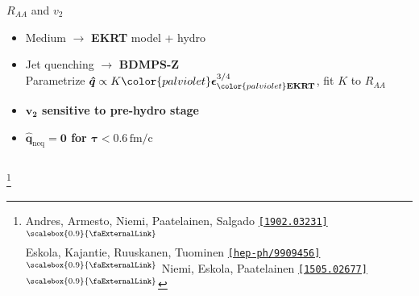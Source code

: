 \documentclass[aspectratio=169,11pt,usenames,dvipsnames]{beamer}
\renewcommand{\thefootnote}{\color{customblue}\faPaperPlaneO}
\newcommand\blfootnote[1]{%
  \begingroup
  \renewcommand\thefootnote{}\footnote{#1}%
  \addtocounter{footnote}{-1}%
  \endgroup
}
\begin{document}
\begin{frame}[t]
\begin{columns}[onlytextwidth,t]
\begin{center}
            {\Large\color{palgold} $R_{AA}$ and $v_2$  \\[10pt]}
            \footnotesize
                \begin{itemize}
                    \item {\color{lightgray}Medium $\rightarrow$ {\bfseries\color{palviolet} EKRT} model + hydro}
                    \item {\color{lightgray}Jet quenching $\rightarrow$ {\bfseries BDMPS-Z}}\\[3pt]
                    {\color{lightgray}Parametrize $\boldsymbol{\hat{q}}\propto K {\color{palviolet}\boldsymbol{\epsilon}}^{3/4}_{\color{palviolet}\mathbf{EKRT}}$, fit $K$ to $R_{AA}$}\\[15pt]
                    \item {\color{destacado}\bfseries\normalsize{$\boldsymbol{v_2}$ sensitive to pre-hydro stage}}
                    \item {\color{destacado}\bfseries\normalsize{$\boldsymbol{\hat{q}_\mathrm{neq}=0}$ for $\boldsymbol{\tau <0.6\,\mathrm{fm/c}}$}}
                \end{itemize}
        \end{center}
    \end{columns}
    \blfootnote{\scriptsize Andres, Armesto, Niemi, Paatelainen, Salgado \href{https://arxiv.org/abs/1902.03231}{\color{palgold}\texttt{[1902.03231]}$^\text{\scalebox{0.9}{\faExternalLink}}$}\\\hspace{14pt} Eskola, Kajantie, Ruuskanen, Tuominen \href{https://arxiv.org/abs/hep-ph/9909456}{\color{palviolet}\texttt{[hep-ph/9909456]}$^\text{\scalebox{0.9}{\faExternalLink}}$} Niemi, Eskola, Paatelainen \href{https://arxiv.org/abs/1505.02677}{\color{palviolet}\texttt{[1505.02677]}$^\text{\scalebox{0.9}{\faExternalLink}}$}}
\end{frame}

\end{document}
